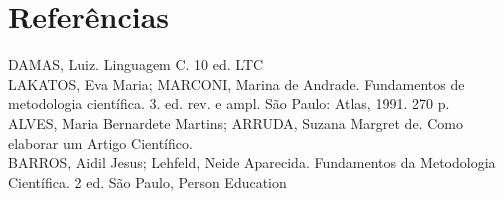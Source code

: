 \documentclass[11pts]{book}
\begin{document}
\section{Referências}

DAMAS, Luiz. Linguagem C. 10 ed. LTC\\

LAKATOS, Eva Maria; MARCONI, Marina de Andrade.
Fundamentos de metodologia científica. 3. ed. rev. e ampl. São Paulo: Atlas,
1991. 270 p.\\

ALVES, Maria Bernardete Martins; ARRUDA, Suzana Margret de. Como elaborar
um Artigo Científico.\\

BARROS, Aidil Jesus; Lehfeld, Neide Aparecida.
Fundamentos da Metodologia Científica. 2 ed. São Paulo, Person Education
\end{document}
